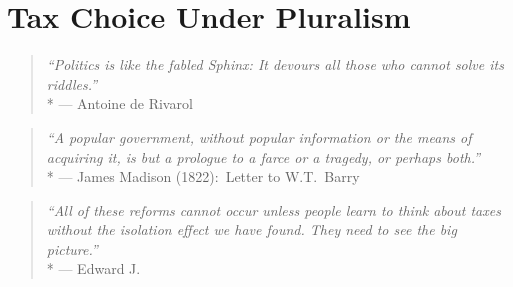 
\chapter[Tax Choice Under Pluralism]{Tax Choice Under Pluralism} \label{chap:tax-under-pluralism}



\begin{quote}
	\emph{``Politics is like the fabled Sphinx:
	It devours all those who cannot solve its riddles.''}
	\\*
	--- Antoine de Rivarol
\end{quote}

\begin{quote}
	\emph{``A popular government, without popular information or the means of acquiring it, is but a prologue to a farce or a tragedy, or perhaps both.''}
	\\*
	--- James Madison (1822):\ Letter to W.T.~Barry
\end{quote}

\begin{quote}
	\emph{``All of these reforms cannot occur unless people learn to think about taxes without the isolation effect we have found.
	They need to see the big picture.''}
	\\*
	--- Edward J.~\citet[23]{McCaffery2003}
\end{quote}





